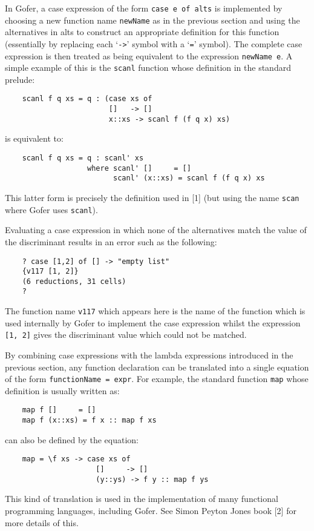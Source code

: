 In Gofer, a case expression of the form \verb"case e of alts"  is  implemented
by choosing a new function name \verb"newName" as in  the  previous  section
and  using  the  alternatives  in  alts  to  construct  an  appropriate
definition for this function (essentially by replacing each `\verb"->"' symbol
with a `\verb"="' symbol).  The complete case expression is  then  treated  as
being equivalent to the expression \verb"newName e".  A  simple  example  of
this is the \verb"scanl" function whose definition in the standard prelude:
\begin{verbatim}
    scanl f q xs = q : (case xs of
                        []   -> []
                        x::xs -> scanl f (f q x) xs)
\end{verbatim}
is equivalent to:
\begin{verbatim}
    scanl f q xs = q : scanl' xs
                   where scanl' []     = []
                         scanl' (x::xs) = scanl f (f q x) xs
\end{verbatim}
This latter form is precisely the definition used in [1] (but using the
name \verb"scan" where Gofer uses \verb"scanl").

Evaluating a case expression in which none of  the  alternatives  match
the value  of  the  discriminant  results  in  an  error  such  as  the
following:
\begin{verbatim}
    ? case [1,2] of [] -> "empty list"
    {v117 [1, 2]}
    (6 reductions, 31 cells)
    ?
\end{verbatim}
The function name \verb"v117" which appears here is the name of the function
which is used internally by Gofer  to  implement  the  case  expression
whilst the expression \verb"[1, 2]" gives the discriminant value which could
not be matched.

By combining case expressions with the lambda expressions introduced in
the previous section, any function declaration can be translated into a
single equation of the form \verb"functionName = expr".  For example,  the
standard function \verb"map" whose definition is usually written as:
\begin{verbatim}
    map f []     = []
    map f (x::xs) = f x :: map f xs
\end{verbatim}
can also be defined by the equation:
\begin{verbatim}
    map = \f xs -> case xs of
                     []     -> []
                     (y::ys) -> f y :: map f ys
\end{verbatim}
This kind  of  translation  is  used  in  the  implementation  of  many
functional programming languages, including Gofer.   See  Simon  Peyton
Jones book [2] for more details of this.


